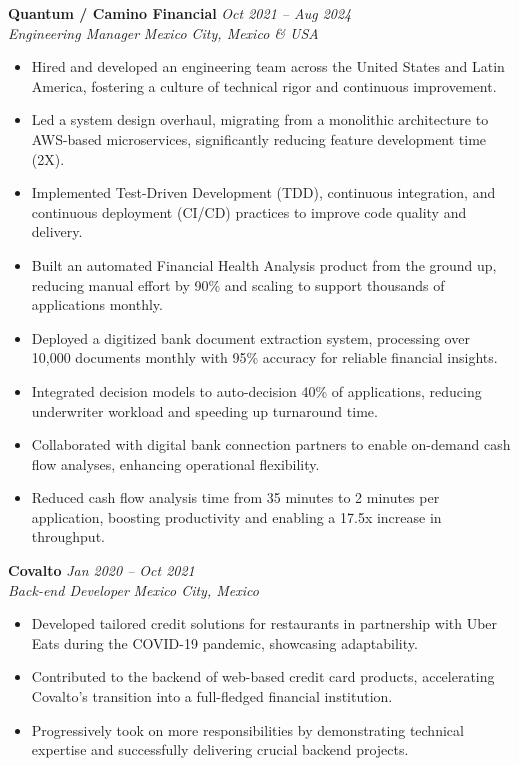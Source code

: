 \documentclass[a4paper,10pt]{article}
\begin{document}
\textbf{Quantum / Camino Financial} \hfill \textit{Oct 2021 -- Aug 2024}\\
\textit{Engineering Manager} \hfill \textit{Mexico City, Mexico \& USA}\\
\begin{itemize}[leftmargin=0.5cm, topsep=0pt, parsep=0pt, itemsep=2pt]
	\item Hired and developed an engineering team across the United States and
	      Latin America, fostering a culture of technical rigor and continuous
	      improvement.
	\item Led a system design overhaul, migrating from a monolithic architecture
	      to AWS-based microservices, significantly reducing feature development time (2X).
	\item Implemented Test-Driven Development (TDD), continuous integration, and
	      continuous deployment (CI/CD) practices to improve code quality and delivery.
	\item Built an automated Financial Health Analysis product from the ground up,
	      reducing manual effort by 90\% and scaling to support thousands of
	      applications monthly.
	\item Deployed a digitized bank document extraction system, processing over
	      10,000 documents monthly with 95\% accuracy for reliable financial insights.
	\item Integrated decision models to auto-decision 40\% of applications,
	      reducing underwriter workload and speeding up turnaround time.
	\item Collaborated with digital bank connection partners to enable on-demand
	      cash flow analyses, enhancing operational flexibility.
	\item Reduced cash flow analysis time from 35 minutes to 2 minutes per
	      application, boosting productivity and enabling a 17.5x increase in
	      throughput.
\end{itemize}

\textbf{Covalto} \hfill \textit{Jan 2020 -- Oct 2021}\\
\textit{Back-end Developer} \hfill \textit{Mexico City, Mexico}\\
\begin{itemize}[leftmargin=0.5cm, topsep=0pt, parsep=0pt, itemsep=2pt]
	\item Developed tailored credit solutions for restaurants in partnership with
	      Uber Eats during the COVID-19 pandemic, showcasing adaptability.
	\item Contributed to the backend of web-based credit card products,
	      accelerating Covalto’s transition into a full-fledged financial institution.
	\item Progressively took on more responsibilities by demonstrating technical
	      expertise and successfully delivering crucial backend projects.
\end{itemize}
\end{document}
